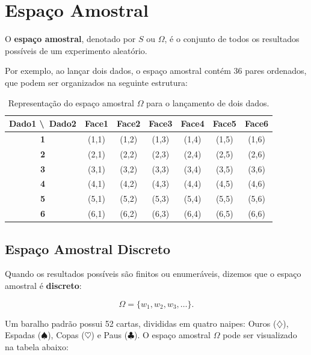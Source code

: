 \newpage
\section{Espaço Amostral}

O \textbf{espaço amostral}, denotado por $S$ ou $\Omega$, é o conjunto de todos
os resultados possíveis de um experimento aleatório.
\vskip0.3cm

Por exemplo, ao lançar dois dados, o espaço amostral contém $36$ pares ordenados, que podem ser organizados na seguinte estrutura:

\begin{table}[H]
\centering
\caption{Representação do espaço amostral $\Omega$ para o lançamento de dois dados.}
\label{tab:espaco_amostral}
\renewcommand{\arraystretch}{1.5} %
\setlength{\tabcolsep}{8pt}      %
\begin{tabular}{|c|c|c|c|c|c|c|}
\hline \hline
\rowcolor{gray!20} \textbf{Dado1 \textbackslash \ Dado2} & \textbf{Face1} & \textbf{Face2} & \textbf{Face3} & \textbf{Face4} & \textbf{Face5} & \textbf{Face6} \\ 
\hline \hline
\rowcolor{blue!15} \textbf{1} & (1,1) & (1,2) & (1,3) & (1,4) & (1,5) & (1,6) \\
\rowcolor{blue!15} \textbf{2} & (2,1) & (2,2) & (2,3) & (2,4) & (2,5) & (2,6) \\
\rowcolor{blue!15} \textbf{3} & (3,1) & (3,2) & (3,3) & (3,4) & (3,5) & (3,6) \\
\rowcolor{blue!15} \textbf{4} & (4,1) & (4,2) & (4,3) & (4,4) & (4,5) & (4,6) \\
\rowcolor{blue!15} \textbf{5} & (5,1) & (5,2) & (5,3) & (5,4) & (5,5) & (5,6) \\
\rowcolor{blue!15} \textbf{6} & (6,1) & (6,2) & (6,3) & (6,4) & (6,5) & (6,6) \\ 
\hline \hline
\end{tabular}
\end{table}


\newpage
\subsection{Espaço Amostral Discreto}

Quando os resultados possíveis são finitos ou enumeráveis, dizemos que o espaço
amostral é \textbf{discreto}:

\[
\Omega = \{w_1,w_2,w_3,\dots\}.
\]

Um baralho padrão possui 52 cartas, divididas em quatro naipes: Ouros ($\diamondsuit$), Espadas ($\spadesuit$), Copas ($\heartsuit$) e Paus ($\clubsuit$). O espaço amostral $\Omega$ pode ser visualizado na tabela abaixo:

